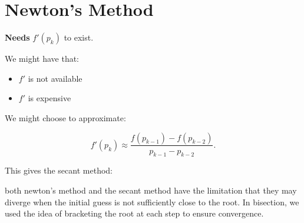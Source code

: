 \section{Newton's Method}

\textbf{Needs} $f'(p_k)$ to exist.

We might have that:
\begin{itemize}
\item $f'$ is not available
\item $f'$ is expensive
\end{itemize}

We might choose to approximate:

\[
  f'(p_k) \approx \frac{f(p_{k-1})-f(p_{k-2})}{p_{k-1}-p_{k-2}}
.\]

This gives the secant method:

\begin{center}
\end{center}

both newton's method and the secant method have the limitation that they may
diverge when the initial guess is not sufficiently close to the root. In 
bisection, we used the idea of bracketing the root at each step to ensure
convergence. 

